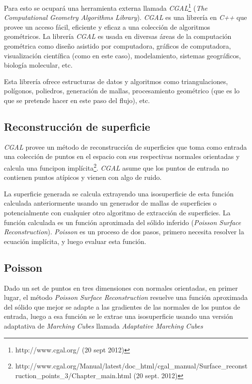 Para esto se ocupará una herramienta externa llamada \emph{CGAL}\footnote{http://www.cgal.org/ (20 sept 2012)} (\emph{The Computational Geometry Algorithms Library}). \emph{CGAL} es una librería en \emph{C++} que provee un acceso fácil, eficiente y eficaz a una colección de algoritmos geométricos. La librería \emph{CGAL} es usada en diversas áreas de la computación geométrica como diseño asistido por computadora, gráficos de computadora, visualización científica (como en este caso), modelamiento, sistemas geográficos, biología molecular, etc.

Esta librería ofrece estructuras de datos y algoritmos como triangulaciones, polígonos, poliedros, generación de mallas, procesamiento geométrico (que es lo que se pretende hacer en este paso del flujo), etc.

\subsection{Reconstrucción de superficie}
\label{ch:propuesta:sec:refinamiento:reconstruccionDeSuperficie}

\emph{CGAL} provee un método de reconstrucción de superficies que toma como entrada una colección de puntos en el espacio con sus respectivas normales orientadas y calcula una funcipon implícita\footnote{http://www.cgal.org/Manual/latest/doc\_html/cgal\_manual/Surface\_reconstruction\_points\_3/Chapter\_main.html (20 sept. 2012)}. \emph{CGAL} asume que los puntos de entrada no contienen puntos atípicos y vienen con algo de ruido.

La superficie generada se calcula extrayendo una isosuperficie de esta función calculada anteriormente usando un generador de mallas de superficies \cite{Rineau2007100} o potencialmente con cualquier otro algoritmo de extracción de superficies. La función calculada es un función aproximada del sólido inferido (\emph{Poisson Surface Reconstruction}). \emph{Poisson} es un proceso de dos pasos, primero necesita resolver la ecuación implícita, y luego evaluar esta función.

\subsection{Poisson}
\label{ch:propuesta:sec:refinamiento:poisson}

Dado un set de puntos en tres dimensiones con normales orientadas, en primer lugar, el método \emph{Poisson Surface Reconstruction} \cite{Kazhdan2006PoissonSurfaceReconstruction} resuelve una función aproximada del sólido que mejor se adapte a las gradientes de las normales de los puntos de entrada, luego a esa función se le extrae una isosuperficie usando una versión adaptativa de \emph{Marching Cubes} llamada \emph{Adaptative Marching Cubes} \cite{Shu95adaptivemarching}

